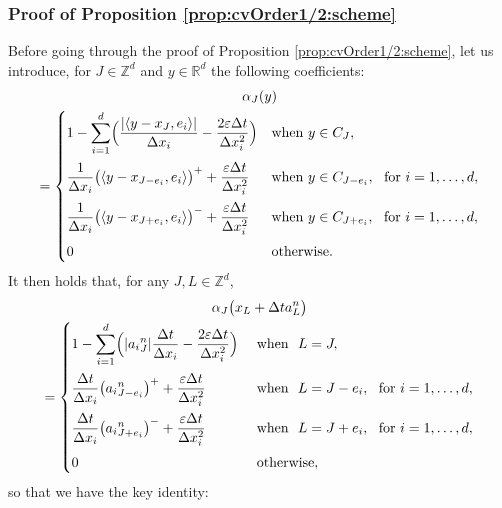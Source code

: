 \documentclass[JEP,XML,SOM,Unicode, NoFloatCountersInSection,published]{cedram}
\def\RR{\mathbb{R}}
\def\ZZ{\mathbb{Z}}
\let\ds\displaystyle
\def\eps{\varepsilon}
\def\dt{\Delta t}
\def\dx{\Delta x}
\theoremstyle{plain}
\theoremstyle{definition}
\begin{document}
\subsubsection{Proof of Proposition \ref{prop:cvOrder1/2:scheme}}

Before going through the proof of Proposition \ref{prop:cvOrder1/2:scheme}, let us introduce, for $J\in\ZZ^d$ and $y \in \RR^d$ the following coefficients:
\begin{multline}\label{def:alpha}
\alpha_J(y)\\
=
\begin{cases}
\ds 1-\sum_{i=1}^d \Bigl(\frac{|\langle y-{x_J},e_i\rangle|}{\dx_i} - \frac{2\eps\dt}{\dx_i^2}\Bigr)
& \textup{when} \ y\in C_J,
\vspace{5pt}
\\
\ds \frac{1}{\dx_i}\bigl(\langle y-x_{J-e_i},e_i\rangle\bigr)^+ + \frac{\eps\dt}{\dx_i^2}
&\textup{when} \ y\in C_{J-e_i}, \ \ \textup{for} \ i= 1,\dots,d,
\vspace{5pt}
\\
\ds \frac{1}{\dx_i}\bigl(\langle y-x_{J+e_i},e_i\rangle\bigr)^- + \frac{\eps\dt}{\dx_i^2}
&\textup{when} \ y\in C_{J+e_i}, \ \ \textup{for} \ i=1,\dots,d,
\vspace{5pt}
\\
0 &\textup{otherwise}.
\end{cases}
\end{multline}
It then holds that, for any $J,L \in {\mathbb Z}^d$,
\begin{multline*}%
\alpha_{J} \bigl( x_{L} + \dt a^n_{L}\bigr)\\ =
\begin{cases}
\ds 1-\sum_{i=1}^d \Bigl(\vert {a_{i}}^n_{J} \vert \frac{\dt}{\dx_i} - \frac{2\eps\dt}{\dx_i^2}\Bigr)
&\textup{ when } \ L=J,
\vspace{5pt}
\\
\ds \frac{\dt}{\dx_i}\bigl( {a_{i}}^n_{J-e_{i}} \bigr)^{+} + \frac{\eps\dt}{\dx_i^2}
&\textup{ when } \ L = J-e_{i}, \ \ \textup{for} \ i= 1,\dots,d,
\vspace{5pt}
\\
\ds \frac{\dt}{\dx_i}\bigl( {a_{i}}^n_{J+e_{i}} \bigr)^{-} + \frac{\eps\dt}{\dx_i^2}
&\textup{ when } \ L = J+e_{i}, \ \ \textup{for} \ i= 1,\dots,d,
\vspace{5pt}
\\
0 & \textup{ otherwise},
\end{cases}
\end{multline*}
so that we have the key identity:
\end{document}
